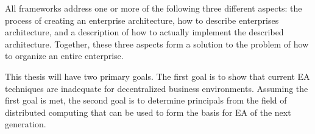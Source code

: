 All frameworks address one or more of the following three different aspects: the process of creating an enterprise architecture, how to describe enterprises architecture, and a description of how to actually implement the described architecture. Together, these three aspects form a solution to the problem of how to organize an entire enterprise.

This thesis will have two primary goals. The first goal is to show that current EA techniques are inadequate for decentralized business environments. Assuming the first goal is met, the second goal is to determine principals from the field of distributed computing that can be used to form the basis for EA of the next generation.  